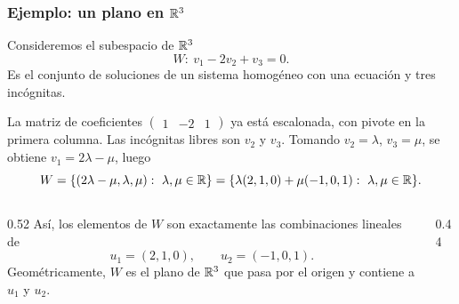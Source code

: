 \begin{frame}[allowframebreaks]
    \frametitle{Ejemplo: un plano en $\mathbb{R}^3$}

    \begin{example}
        Consideremos el subespacio de $\mathbb{R}^3$
        \[
            W\colon\ v_1-2v_2+v_3=0.
        \]
        Es el conjunto de soluciones de un sistema homogéneo con una ecuación
        y tres incógnitas.
    \end{example}

    La matriz de coeficientes $\begin{pmatrix}1&-2&1\end{pmatrix}$ ya está
    escalonada, con pivote en la primera columna. Las incógnitas libres son
    $v_2$ y $v_3$. Tomando $v_2=\lambda$, $v_3=\mu$, se obtiene
    $v_1=2\lambda-\mu$, luego
    \[
        W=\{(2\lambda-\mu,\lambda,\mu):\ \lambda,\mu\in\R\}
        =\{\lambda(2,1,0)+\mu(-1,0,1):\ \lambda,\mu\in\R\}.
    \]

    \framebreak

    \begin{columns}[T]
        \begin{column}{0.52\textwidth}
            Así, los elementos de $W$ son exactamente las
            \alert{combinaciones lineales} de
            \[
                u_1=(2,1,0),
                \qquad
                u_2=(-1,0,1).
            \]
            Geométricamente, $W$ es el \alert{plano} de $\mathbb{R}^3$ que pasa
            por el origen y contiene a $u_1$ y $u_2$.
        \end{column}
        \begin{column}{0.44\textwidth}
            \centering
        \end{column}
    \end{columns}


\end{frame}
